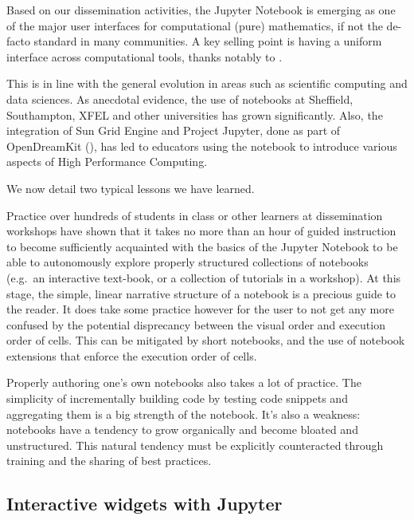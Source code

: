 \documentclass{deliverablereport}
\begin{document}
Based on our dissemination activities, the Jupyter Notebook is
emerging as one of the major user interfaces for computational (pure)
mathematics, if not the de-facto standard in many communities. A key
selling point is having a uniform interface across computational
tools, thanks notably to .

This is in line with the general evolution in areas such as scientific
computing and data sciences. As anecdotal evidence, the use of
notebooks at Sheffield, Southampton, XFEL and other universities has
grown significantly. Also, the integration of Sun Grid Engine and
Project Jupyter, done as part of OpenDreamKit
(), has led to educators using the
notebook to introduce various aspects of High Performance Computing.

We now detail two typical lessons we have learned.

Practice over hundreds of students in class or other learners at
dissemination workshops have shown that it takes no more than an hour of
guided instruction to become sufficiently acquainted with the basics of
the Jupyter Notebook to be able to autonomously explore properly
structured collections of notebooks (e.g.~an interactive text-book, or a
collection of tutorials in a workshop). At this stage, the simple,
linear narrative structure of a notebook is a precious guide to the
reader.
It does take some practice however for the user to not get any more
confused by the potential disprecancy between the visual order and
execution order of cells. This can be mitigated by short notebooks, and
the use of notebook extensions that enforce the execution order of
cells.

Properly authoring one's own notebooks also takes a lot of practice.
The simplicity of incrementally building code by testing code snippets
and aggregating them is a big strength of the notebook. It's also a
weakness: notebooks have a tendency to grow organically and become
bloated and unstructured. This natural tendency must be explicitly
counteracted through training and the sharing of best practices.

\subsection{Interactive widgets with Jupyter}
\end{document}
